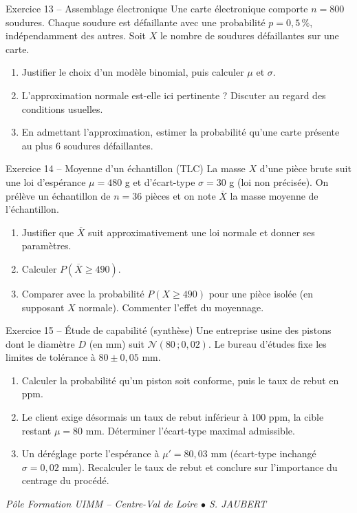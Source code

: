 \documentclass[a4paper,11pt]{article}
\begin{document}
\begin{exo}{Exercice 13 -- Assemblage électronique}
Une carte électronique comporte $n = 800$ soudures. Chaque soudure est défaillante avec une probabilité $p = 0{,}5\,\%$, indépendamment des autres. Soit $X$ le nombre de soudures défaillantes sur une carte.
\begin{enumerate}[label=\alph*)]
  \item Justifier le choix d'un modèle binomial, puis calculer $\mu$ et $\sigma$.
  \item L'approximation normale est-elle ici pertinente ? Discuter au regard des conditions usuelles.
  \item En admettant l'approximation, estimer la probabilité qu'une carte présente au plus $6$ soudures défaillantes.
\end{enumerate}
\end{exo}

\begin{exo}{Exercice 14 -- Moyenne d'un échantillon (TLC)}
La masse $X$ d'une pièce brute suit une loi d'espérance $\mu = 480$ g et d'écart-type $\sigma = 30$ g (loi non précisée). On prélève un échantillon de $n = 36$ pièces et on note $\overline{X}$ la masse moyenne de l'échantillon.
\begin{enumerate}[label=\alph*)]
  \item Justifier que $\overline{X}$ suit approximativement une loi normale et donner ses paramètres.
  \item Calculer $P(\overline{X} \geq 490)$.
  \item Comparer avec la probabilité $P(X \geq 490)$ pour une pièce isolée (en supposant $X$ normale). Commenter l'effet du moyennage.
\end{enumerate}
\end{exo}

\begin{exo}{Exercice 15 -- Étude de capabilité (synthèse)}
Une entreprise usine des pistons dont le diamètre $D$ (en mm) suit $\mathcal{N}(80\,;0{,}02)$. Le bureau d'études fixe les limites de tolérance à $80 \pm 0{,}05$ mm.
\begin{enumerate}[label=\alph*)]
  \item Calculer la probabilité qu'un piston soit conforme, puis le taux de rebut en ppm.
  \item Le client exige désormais un taux de rebut inférieur à $100$ ppm, la cible restant $\mu = 80$ mm. Déterminer l'écart-type maximal admissible.
  \item Un déréglage porte l'espérance à $\mu' = 80{,}03$ mm (écart-type inchangé $\sigma = 0{,}02$ mm). Recalculer le taux de rebut et conclure sur l'importance du centrage du procédé.
\end{enumerate}
\end{exo}

\vfill
\begin{center}\color{uimmgray}\small
\textit{Pôle Formation UIMM -- Centre-Val de Loire $\bullet$ S. JAUBERT}
\end{center}
\end{document}
